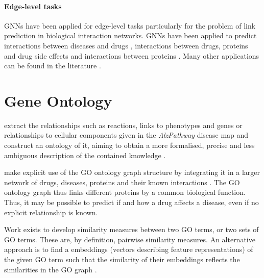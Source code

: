 \documentclass[
	fontsize=10pt, %
	twoside=false, %
	secnumdepth=1, %
  toc=indentunnumbered %
]{kaobook}
\begin{document}


\paragraph{Edge-level tasks} GNNs have been applied for edge-level tasks
particularly for the problem of link prediction in biological interaction
networks. GNNs have been applied to predict interactions between diseases and
drugs \cite{bajaj_GraphConvolutionalNetworks_2017}, interactions between drugs,
proteins and drug side effects \cite{zitnik_modeling_2018} and interactions
between proteins \cite{chereda_ExplainingDecisionsGraph_2021}. Many other
applications can be found in the literature
\cite{zhang_GraphNeuralNetworks_2021}.





\section{Gene Ontology}


\citeauthor{henry_ConvertingDiseaseMaps_2021} extract the relationships such as
reactions, links to phenotypes and genes or relationships to cellular components
given in the \textit{AlzPathway} disease map and construct an ontology of it,
aiming to obtain a more formalised, precise and less ambiguous description of
the contained knowledge \cite{henry_ConvertingDiseaseMaps_2021}.

\citeauthor{ruiz_identification_2021} make explicit use of the GO ontology graph
structure by integrating it in a larger network of drugs, diseases, proteins and
their known interactions \cite{ruiz_identification_2021}. The GO ontology graph
thus links different proteins by a common biological function. Thus, it may be
possible to predict if and how a drug affects a disease, even if no explicit
relationship is known.

Work exists to develop similarity measures between two GO terms, or two sets of
GO terms. \cite{zhao_GOGOImprovedAlgorithm_2018,
  yu_GOSemSimPackageMeasuring_2010, wang_NewMethodMeasure_2007} These are, by
definition, pairwise similarity measures. An alternative approach is to find a
embeddings (vectors describing feature representations) of the given GO term
such that the similarity of their embeddings reflects the similarities in the GO
graph \cite{zhong_GO2VecTransformingGO_2020}.
\end{document}
